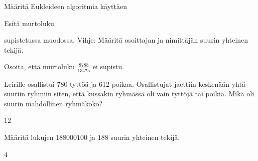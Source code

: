 \begin{tehtava}
    Määritä Eukleideen algoritmia käyttäen
    
    \begin{alakohdat}
    \end{alakohdat}

    \begin{vastaus}
        \begin{alakohdat}
        \end{alakohdat}
    \end{vastaus}
    
\end{tehtava}

\begin{tehtava}
    Esitä murtoluku
    \begin{alakohdat}
    \end{alakohdat}
    supistetussa muodossa. Vihje: Määritä osoittajan ja nimittäjän suurin yhteinen tekijä.

    \begin{vastaus}
        \begin{alakohdat}
        \end{alakohdat}
    \end{vastaus}
    
\end{tehtava}

\begin{tehtava}
    Osoita, että murtoluku $\frac{8788}{13475}$ ei supistu.
\end{tehtava}

\begin{tehtava}
    Leirille osallistui 780 tyttöä ja 612 poikaa. Osallistujat jaettiin keskenään yhtä suuriin ryhmiin siten, että kussakin ryhmässä oli vain tyttöjä tai poikia. Mikä oli suurin mahdollinen ryhmäkoko?
    
    \begin{vastaus}
        12
    \end{vastaus}
    
\end{tehtava}

\begin{tehtava}
    Määritä lukujen $188000100$ ja $188$ suurin yhteinen tekijä.

    \begin{vastaus}
        $4$
    \end{vastaus}
    
\end{tehtava}

